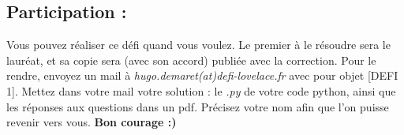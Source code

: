 \documentclass{exam}
\begin{document}
        \subsection*{Participation :}
            Vous pouvez réaliser ce défi quand vous voulez.
            Le premier à le résoudre sera le lauréat, et sa copie sera (avec son accord) publiée avec la correction.
            Pour le rendre, envoyez un mail à \textit{hugo.demaret(at)defi-lovelace.fr} avec pour objet \textrm{[DEFI 1]}.
            Mettez dans votre mail votre solution : le \textit{.py} de votre code python, ainsi que les réponses aux questions dans un pdf.
            Précisez votre nom afin que l'on puisse revenir vers vous.
            \linebreak
            \textbf{Bon courage :)}
        
\end{document}
